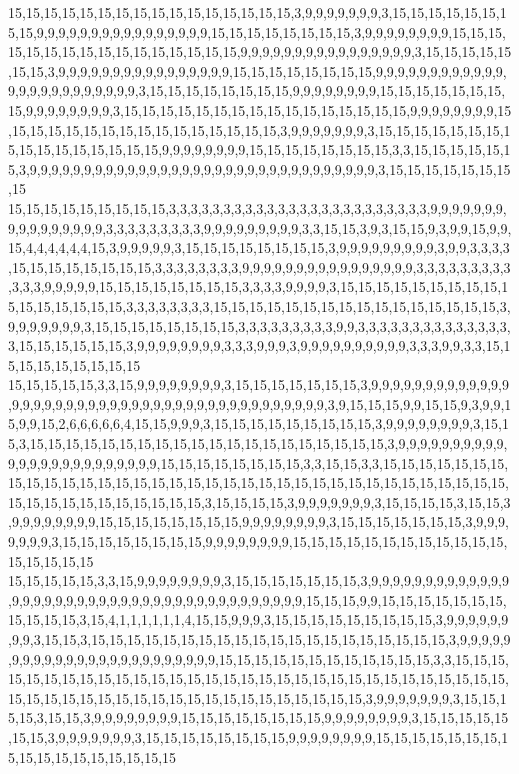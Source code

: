 15,15,15,15,15,15,15,15,15,15,15,15,15,15,15,15,3,9,9,9,9,9,9,9,3,15,15,15,15,15,15,15,15,9,9,9,9,9,9,9,9,9,9,9,9,9,9,9,9,15,15,15,15,15,15,15,15,3,9,9,9,9,9,9,9,9,15,15,15,15,15,15,15,15,15,15,15,15,15,15,15,15,9,9,9,9,9,9,9,9,9,9,9,9,9,9,9,9,3,15,15,15,15,15,15,15,3,9,9,9,9,9,9,9,9,9,9,9,9,9,9,9,9,15,15,15,15,15,15,15,15,9,9,9,9,9,9,9,9,9,9,9,9,9,9,9,9,9,9,9,9,9,9,9,9,3,15,15,15,15,15,15,15,15,9,9,9,9,9,9,9,9,15,15,15,15,15,15,15,15,9,9,9,9,9,9,9,9,3,15,15,15,15,15,15,15,15,15,15,15,15,15,15,15,15,9,9,9,9,9,9,9,9,15,15,15,15,15,15,15,15,15,15,15,15,15,15,15,15,3,9,9,9,9,9,9,9,3,15,15,15,15,15,15,15,15,15,15,15,15,15,15,15,15,9,9,9,9,9,9,9,9,15,15,15,15,15,15,15,15,3,3,15,15,15,15,15,15,3,9,9,9,9,9,9,9,9,9,9,9,9,9,9,9,9,9,9,9,9,9,9,9,9,9,9,9,9,9,9,9,9,3,15,15,15,15,15,15,15,15
15,15,15,15,15,15,15,15,15,3,3,3,3,3,3,3,3,3,3,3,3,3,3,3,3,3,3,3,3,3,3,3,3,9,9,9,9,9,9,9,9,9,9,9,9,9,9,9,9,3,3,3,3,3,3,3,3,3,9,9,9,9,9,9,9,9,9,3,3,15,15,3,9,3,15,15,9,3,9,9,15,9,9,15,4,4,4,4,4,4,15,3,9,9,9,9,9,3,15,15,15,15,15,15,15,15,3,9,9,9,9,9,9,9,9,9,3,9,9,3,3,3,3,15,15,15,15,15,15,15,15,3,3,3,3,3,3,3,3,9,9,9,9,9,9,9,9,9,9,9,9,9,9,9,9,3,3,3,3,3,3,3,3,3,3,3,3,9,9,9,9,9,15,15,15,15,15,15,15,15,3,3,3,3,9,9,9,9,3,15,15,15,15,15,15,15,15,15,15,15,15,15,15,15,15,3,3,3,3,3,3,3,3,15,15,15,15,15,15,15,15,15,15,15,15,15,15,15,15,3,9,9,9,9,9,9,9,3,15,15,15,15,15,15,15,15,3,3,3,3,3,3,3,3,3,9,9,3,3,3,3,3,3,3,3,3,3,3,3,3,3,3,15,15,15,15,15,15,3,9,9,9,9,9,9,9,9,3,3,3,9,9,9,3,9,9,9,9,9,9,9,9,9,9,3,3,3,9,9,3,3,15,15,15,15,15,15,15,15,15
15,15,15,15,15,3,3,15,9,9,9,9,9,9,9,9,3,15,15,15,15,15,15,15,3,9,9,9,9,9,9,9,9,9,9,9,9,9,9,9,9,9,9,9,9,9,9,9,9,9,9,9,9,9,9,9,9,9,9,9,9,9,9,9,9,9,9,3,9,15,15,15,9,9,15,15,9,3,9,9,15,9,9,15,2,6,6,6,6,6,4,15,15,9,9,9,3,15,15,15,15,15,15,15,15,15,3,9,9,9,9,9,9,9,9,3,15,15,3,15,15,15,15,15,15,15,15,15,15,15,15,15,15,15,15,15,15,15,15,3,9,9,9,9,9,9,9,9,9,9,9,9,9,9,9,9,9,9,9,9,9,9,9,9,15,15,15,15,15,15,15,15,3,3,15,15,3,3,15,15,15,15,15,15,15,15,15,15,15,15,15,15,15,15,15,15,15,15,15,15,15,15,15,15,15,15,15,15,15,15,15,15,15,15,15,15,15,15,15,15,15,15,15,15,3,15,15,15,15,3,9,9,9,9,9,9,9,3,15,15,15,15,3,15,15,3,9,9,9,9,9,9,9,9,15,15,15,15,15,15,15,15,9,9,9,9,9,9,9,9,3,15,15,15,15,15,15,15,3,9,9,9,9,9,9,9,3,15,15,15,15,15,15,15,15,9,9,9,9,9,9,9,9,15,15,15,15,15,15,15,15,15,15,15,15,15,15,15,15,15
15,15,15,15,15,3,3,15,9,9,9,9,9,9,9,9,3,15,15,15,15,15,15,15,3,9,9,9,9,9,9,9,9,9,9,9,9,9,9,9,9,9,9,9,9,9,9,9,9,9,9,9,9,9,9,9,9,9,9,9,9,9,9,9,9,15,15,15,9,9,15,15,15,15,15,15,15,15,15,15,15,3,15,4,1,1,1,1,1,1,4,15,15,9,9,9,3,15,15,15,15,15,15,15,15,15,3,9,9,9,9,9,9,9,9,3,15,15,3,15,15,15,15,15,15,15,15,15,15,15,15,15,15,15,15,15,15,15,15,3,9,9,9,9,9,9,9,9,9,9,9,9,9,9,9,9,9,9,9,9,9,9,9,9,15,15,15,15,15,15,15,15,15,15,15,15,3,3,15,15,15,15,15,15,15,15,15,15,15,15,15,15,15,15,15,15,15,15,15,15,15,15,15,15,15,15,15,15,15,15,15,15,15,15,15,15,15,15,15,15,15,15,15,15,15,15,15,15,15,3,9,9,9,9,9,9,9,3,15,15,15,15,3,15,15,3,9,9,9,9,9,9,9,9,15,15,15,15,15,15,15,15,9,9,9,9,9,9,9,9,3,15,15,15,15,15,15,15,3,9,9,9,9,9,9,9,3,15,15,15,15,15,15,15,15,9,9,9,9,9,9,9,9,15,15,15,15,15,15,15,15,15,15,15,15,15,15,15,15,15
